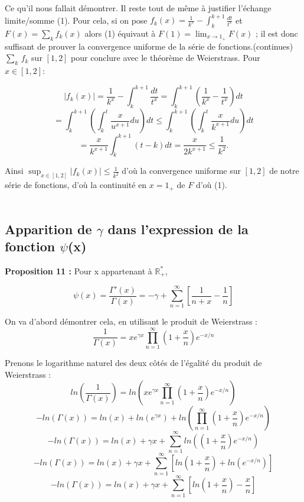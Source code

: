 \documentclass[a4paper,12pt]{article}
\begin{document}
Ce qu'il nous fallait démontrer. Il reste tout de même à justifier l'échange limite/somme (1). Pour cela, si on pose \(f_{k}(x) = \frac{1}{k^{x}} - \int_{k}^{k+1} \frac{dt}{t^{x}}\) et \(F(x) = \sum_{k} f_{k}(x)\) alors (1) équivaut à \(F(1) = \lim_{x\to 1_{+}} F(x)\) ; il est donc suffisant de prouver la convergence uniforme de la série de fonctions.(continues) $\sum_{k}\,f_{k}$ sur $[1,2]$ pour conclure avec le théorème de Weierstrass. Pour $x\in[1,2]:$

\[
|f_{k}(x)| = \frac{1}{k^{x}} - \int_{k}^{k+1}\frac{dt}{t^{x}} = \int_{k}^{k+1} \left(\frac{1}{k^{x}} - \frac{1}{t^{x}}\right)dt
\]
\[
= \int_{k}^{k+1}\left(\int_{k}^{t}\frac{x}{u^{x+1}}du\right)dt \leq \int_{k}^{k+1}\left(\int_{k}^{t}\frac{x}{k^{x+1}}du\right)dt
\]
\[
= \frac{x}{k^{x+1}}\int_{k}^{k+1}(t-k)dt = \frac{x}{2k^{x+1}} \leq \frac{1}{k^{2}}.
\]

Ainsi $\sup_{x\in[1,2]}|f_{k}(x)| \leq \frac{1}{k^{2}}$ d'où la convergence uniforme sur $[1,2]$ de notre série de fonctions, d'où la continuité en $x=1_{+}$ de $F$ d'où (1). \\ \\

\subsection{Apparition de $\gamma$ dans l'expression de la fonction $\psi$(x)}
 \color{black}

\textbf{Proposition 11 : } Pour x appartenant à  $\mathbb{R}_+^\ast$, 

\[ \psi(x) = \frac{\Gamma'(x)}{\Gamma(x)} = - \gamma + \sum_{n=1}^\infty [\frac{1}{n+x} - \frac{1}{n}]\]

On va d'abord démontrer cela, 
en utilisant le produit de Weierstrass :
\[
\frac{1}{\Gamma(x)} = x e^{\gamma x} \prod_{n=1}^{\infty} \left(1 + \frac{x}{n}\right) e^{-x/n}
\]


Prenons le logarithme naturel des deux côtés de l'égalité du produit de Weierstrass :
\[
ln\left(\frac{1}{\Gamma(x)}\right) = ln\left(x e^{\gamma x} \prod_{n=1}^{\infty} \left(1 + \frac{x}{n}\right) e^{-x/n}\right)
\]
\[
-ln(\Gamma(x)) = ln(x) + ln(e^{\gamma x}) + ln\left(\prod_{n=1}^{\infty} \left(1 + \frac{x}{n}\right) e^{-x/n}\right)
\]
\[
-ln(\Gamma(x)) = ln(x) + \gamma x + \sum_{n=1}^{\infty} ln\left(\left(1 + \frac{x}{n}\right) e^{-x/n}\right)
\]
\[
-ln(\Gamma(x)) = ln(x) + \gamma x + \sum_{n=1}^{\infty} \left[ ln\left(1 + \frac{x}{n}\right) + ln\left(e^{-x/n}\right) \right]
\]
\[  
-ln(\Gamma(x)) = ln(x) + \gamma x + \sum_{n=1}^{\infty} \left[ ln\left(1 + \frac{x}{n}\right) - \frac{x}{n} \right]
\]
\end{document}
